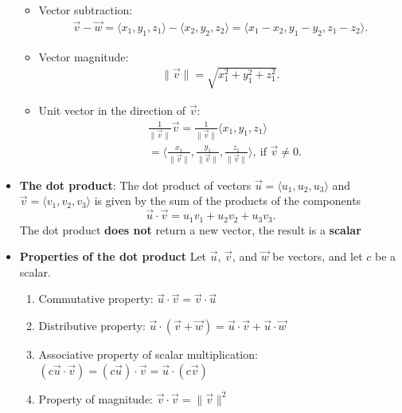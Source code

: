 \documentclass{report}
\begin{document}
\begin{itemize}
\begin{itemize}
            \item Vector subtraction: 
                \begin{align*}
                    \vec{v} - \vec{w} = \langle x_1, y_1, z_1 \rangle - \langle x_2, y_2, z_2 \rangle = \langle x_1 - x_2, y_1 - y_2, z_1 - z_2 \rangle
                .\end{align*}
            \item Vector magnitude: 
                \begin{align*}
                    \|\vec{v}\| = \sqrt{x_1^2 + y_1^2 + z_1^2}
                .\end{align*}
            \item Unit vector in the direction of $\vec{v}$:
                \begin{align*}
                    &\frac{1}{\|\vec{v}\|}\vec{v} = \frac{1}{\|\vec{v}\|}\langle x_1, y_1, z_1 \rangle  \\
                    &= \bigg\langle \frac{x_1}{\|\vec{v}\|}, \frac{y_1}{\|\vec{v}\|}, \frac{z_1}{\|\vec{v}\|} \bigg\rangle,\ \text{if } \vec{v} \neq 0
                .\end{align*}
            \end{itemize}
            \item \textbf{The dot product}:
                The dot product of vectors $\vec{u} = \langle u_1, u_2, u_3 \rangle$ and $\vec{v} = \langle v_1, v_2, v_3 \rangle$ is given by the sum of the products of the components
                \[
                    \vec{u} \cdot \vec{v} = u_1v_1 + u_2v_2 + u_3v_3.
                \]
                The dot product \textbf{does not} return a new vector, the result is a \textbf{scalar}
            \item \textbf{Properties of the dot product}
                Let $\vec{u}$, $\vec{v}$, and $\vec{w}$ be vectors, and let $c$ be a scalar.
                \begin{enumerate}
                    \item Commutative property: $\vec{u} \cdot \vec{v} = \vec{v} \cdot \vec{u}$
                    \item Distributive property: $\vec{u} \cdot (\vec{v} + \vec{w}) = \vec{u} \cdot \vec{v} + \vec{u} \cdot \vec{w}$
                    \item Associative property of scalar multiplication: $(c\vec{u} \cdot \vec{v}) = (c\vec{u}) \cdot \vec{v} = \vec{u} \cdot (c\vec{v})$
                    \item Property of magnitude: $\vec{v} \cdot \vec{v} = \|\vec{v}\|^2$

\end{enumerate}
\end{itemize}
\end{document}
